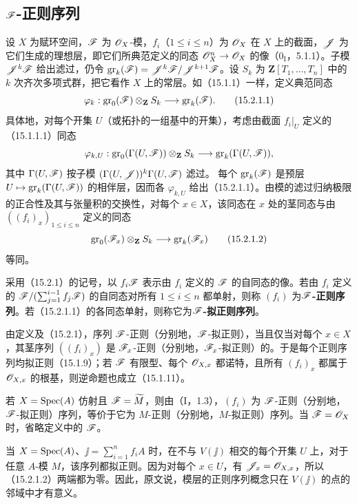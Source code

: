 \subsection{\texorpdfstring{$\mathscr F$}{F}-正则序列}
设 $X$ 为赋环空间，$\mathscr F$ 为 $\mathscr O_X$-模，$f_i$（$1\leq i\leq n$）为 $\mathscr O_X$ 在 $X$ 上的截面，$\mathscr J$ 为它们生成的理想层，即它们所典范定义的同态 $\mathscr O_X^n\to\mathscr O_X$ 的像（$0_{\mathrm I}$，5.1.1）。子模 $\mathscr J^k\mathscr F$ 给出滤过，仍令
$\operatorname{gr}_k(\mathscr F)=\mathscr J^k\mathscr F/\mathscr J^{k+1}\mathscr F$。设 $S_k$ 为 $\mathbf Z[T_1,\ldots,T_n]$ 中的 $k$ 次齐次多项式群，把它看作 $X$ 上的常层。如（15.1.1）一样，定义典范同态
\begin{equation}
 \varphi_k:\operatorname{gr}_0(\mathscr F)\otimes_{\mathbf Z}S_k\longrightarrow\operatorname{gr}_k(\mathscr F).
 \tag{15.2.1.1}
\end{equation}
具体地，对每个开集 $U$（或拓扑的一组基中的开集），考虑由截面 $f_i|_U$ 定义的（15.1.1.1）同态
\[
 \varphi_{k,U}:\operatorname{gr}_0(\Gamma(U,\mathscr F))\otimes_{\mathbf Z}S_k
       \longrightarrow\operatorname{gr}_k(\Gamma(U,\mathscr F)),
\]
其中 $\Gamma(U,\mathscr F)$ 按子模 $(\Gamma(U,\mathscr J))^k\Gamma(U,\mathscr F)$ 滤过。
每个 $\operatorname{gr}_k(\mathscr F)$ 是预层 $U\mapsto\operatorname{gr}_k(\Gamma(U,\mathscr F))$ 的相伴层，因而各 $\varphi_{k,U}$ 给出（15.2.1.1）。由模的滤过归纳极限的正合性及其与张量积的交换性，对每个 $x\in X$，该同态在 $x$ 处的茎同态与由 $((f_i)_x)_{1\leq i\leq n}$ 定义的同态
\begin{equation}
 \operatorname{gr}_0(\mathscr F_x)\otimes_{\mathbf Z}S_k\longrightarrow\operatorname{gr}_k(\mathscr F_x)
 \tag{15.2.1.2}
\end{equation}
等同。

采用（15.2.1）的记号，以 $f_i\mathscr F$ 表示由 $f_i$ 定义的 $\mathscr F$ 的自同态的像。若由 $f_i$ 定义的
$\mathscr F/(\sum_{j=1}^{i-1}f_j\mathscr F)$ 的自同态对所有 $1\leq i\leq n$ 都单射，则称 $(f_i)$ 为\textbf{$\mathscr F$-正则序列}。若（15.2.1.1）的各同态单射，则称它为\textbf{$\mathscr F$-拟正则序列}。

由定义及（15.2.1），序列 $\mathscr F$-正则（分别地，$\mathscr F$-拟正则），当且仅当对每个 $x\in X$，其茎序列 $((f_i)_x)$ 是 $\mathscr F_x$-正则（分别地，$\mathscr F_x$-拟正则）的。于是每个正则序列均拟正则（15.1.9）；若 $\mathscr F$ 有限型、每个 $\mathscr O_{X,x}$ 都诺特，且所有 $(f_i)_x$ 都属于 $\mathscr O_{X,x}$ 的根基，则逆命题也成立（15.1.11）。

若 $X=\operatorname{Spec}(A)$ 仿射且 $\mathscr F=\widetilde M$，则由（I，1.3），$(f_i)$ 为 $\mathscr F$-正则（分别地，$\mathscr F$-拟正则）序列，等价于它为 $M$-正则（分别地，$M$-拟正则）序列。当 $\mathscr F=\mathscr O_X$ 时，省略定义中的 $\mathscr F$。

当 $X=\operatorname{Spec}(A)$、$\jj=\sum_{i=1}^n f_iA$ 时，在不与 $V(\jj)$ 相交的每个开集 $U$ 上，对于任意 $A$-模 $M$，该序列都拟正则。因为对每个 $x\in U$，有 $\mathscr J_x=\mathscr O_{X,x}$，所以（15.2.1.2）两端都为零。因此，原文说，模层的正则序列概念只在 $V(\jj)$ 的点的邻域中才有意义。

